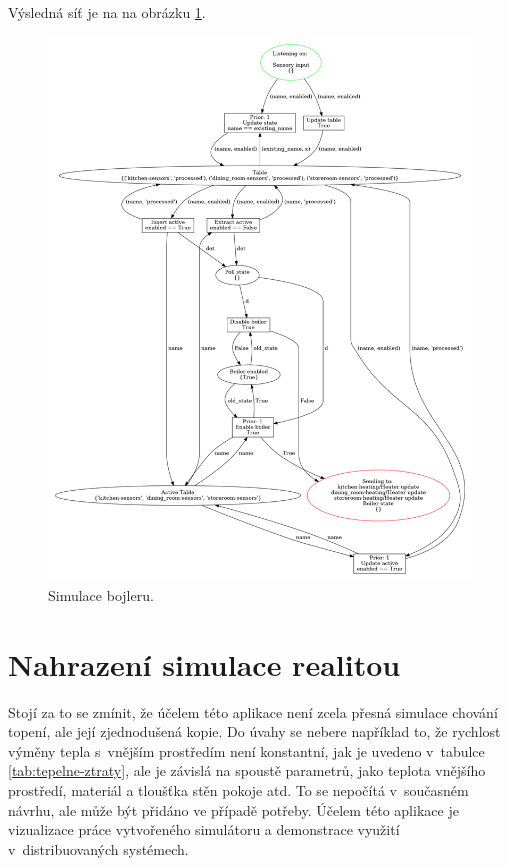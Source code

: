 Výsledná síť je na na obrázku \ref{boiler-logic-viz}.

\begin{figure}[httb]
 \centering
 \includegraphics[width=\textwidth]{obrazky-figures/boiler-logic.png}
 \caption{Simulace bojleru.}
 \label{boiler-logic-viz}
\end{figure}

\section{Nahrazení simulace realitou}

Stojí za to se zmínit, že účelem této aplikace není zcela přesná simulace chování topení, ale její zjednodušená kopie. Do úvahy se nebere například to, že rychlost výměny tepla s~vnějším prostředím není konstantní, jak je uvedeno v~tabulce \ref{tab:tepelne-ztraty}, ale je závislá na spoustě parametrů, jako teplota vnějšího prostředí, materiál a tloušťka stěn pokoje atd. To se nepočítá v~současném návrhu, ale může být přidáno ve případě potřeby. Účelem této aplikace je vizualizace práce vytvořeného simulátoru a demonstrace využití v~distribuovaných systémech.

